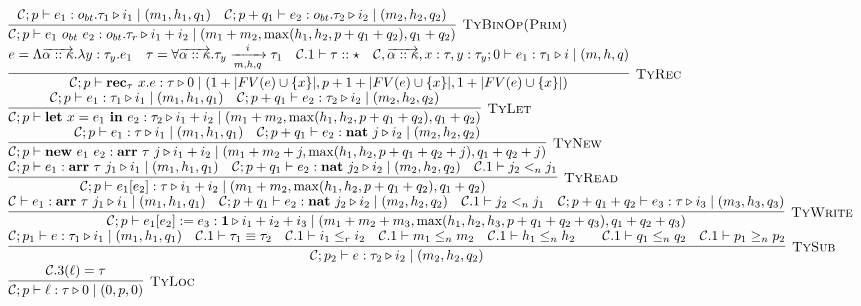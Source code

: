 \documentclass[fleqn]{article}
\begin{document}
\[\begin{array}{l}
\infer[\textsc{TyBinOp(Prim)}]{\jtygc{\mathcal{C};p }{ e_1~o_{bt}~e_2 }{o_{bt}.\tau_r }{ i_1 + i_2 }{ m_1 + m_2}{\max(h_1,h_2,p+q_1+q_2)}{q_1+q_2} }{\jtygc{\mathcal{C};p }{ e_1 }{ o_{bt}.\tau_1 }{ i_1 }{ m_1}{h_1}{q_1} & \jtygc{\mathcal{C};p+q_1 }{ e_2 }{ o_{bt}.\tau_2 }{ i_2 }{ m_2}{h_2}{q_2} } \\

\infer[\textsc{TyRec}]{\jtygc{\mathcal{C};p }{ \mathbf{rec}_\tau~x. e }{ \tau }{ 0 }{1 + |FV(e) \cup \{x\}| }{ p+1+|FV(e)\cup\{x\}| }{1+|FV(e)\cup\{x\}|} }{e = \Lambda \overrightarrow{\alpha :: \kappa}. \lambda y : \tau_y. e_1 & \tau = \forall \overrightarrow{\alpha :: \kappa}. \tau_y \xrightarrow[m,h,q]{i} \tau_1 & \mathcal{C}.1 \vdash \tau :: \star & \jtygc{ \mathcal{C},\overrightarrow{\alpha::\kappa},x:\tau,y:\tau_y;0 }{ e_1 }{ \tau_1 }{ i }{ m}{h}{q}  } \\

\infer[\textsc{TyLet}]{\jtygc{\mathcal{C};p }{ \mathbf{let}~x=e_1~\mathbf{in}~e_2 }{ \tau_2 }{ i_1 + i_2 }{ m_1 + m_2}{\max(h_1,h_2,p+q_1+q_2)}{q_1+q_2} }{\jtygc{\mathcal{C};p }{ e_1 }{ \tau_1 }{ i_1 }{ m_1 }{h_1}{q_1} & \jtygc{\mathcal{C};p+q_1 }{ e_2 }{ \tau_2 }{ i_2 }{ m_2}{h_2}{q_2} } \\

\infer[\textsc{TyNew}]{\jtygc{\mathcal{C};p }{ \mathbf{new}~e_1~e_2 }{ \mathbf{arr}~\tau~j }{ i_1 + i_2 }{ m_1 + m_2 + j}{\max(h_1,h_2,p+q_1+q_2+j) }{q_1+q_2+j} }{\jtygc{\mathcal{C};p }{ e_1 }{\tau }{ i_1 }{ m_1}{h_1}{q_1}  & \jtygc{\mathcal{C};p+q_1 }{ e_2 }{ \mathbf{nat}~j }{ i_2 }{ m_2}{h_2}{q_2} } \\

\infer[\textsc{TyRead}]{\jtygc{\mathcal{C};p }{ e_1[e_2] }{ \tau }{ i_1 + i_2 }{ m_1 + m_2}{\max(h_1,h_2,p+q_1+q_2)}{q_1+q_2} }{\jtygc{\mathcal{C};p }{ e_1 }{ \mathbf{arr}~\tau~j_1 }{ i_1 }{ m_1}{h_1}{q_1} & \jtygc{\mathcal{C};p+q_1 }{ e_2 }{ \mathbf{nat}~j_2 }{ i_2 }{ m_2}{h_2}{q_2} & \mathcal{C}.1 \vdash j_2 <_n j_1 } \\

\infer[\textsc{TyWrite}]{\jtygc{\mathcal{C};p }{ e_1[e_2] := e_3 }{ \mathbf{1} }{ i_1 + i_2 + i_3 }{ m_1 + m_2 + m_3}{\max(h_1,h_2,h_3,p+q_1+q_2+q_3)}{q_1+q_2+q_3} }{\jtygc{\mathcal{C} }{ e_1 }{ \mathbf{arr}~\tau~j_1 }{ i_1 }{ m_1}{h_1}{q_1} & \jtygc{\mathcal{C};p+q_1 }{ e_2 }{\mathbf{nat}~j_2 }{ i_2 }{ m_2}{h_2}{q_2} & \mathcal{C}.1 \vdash j_2 <_n j_1 & \jtygc{\mathcal{C};p+q_1+q_2 }{ e_3 }{ \tau }{ i_3 }{ m_3}{h_3}{q_3} } \\

\infer[\textsc{TySub}]{\jtygc{\mathcal{C};p_2 }{ e }{\tau_2 }{ i_2 }{ m_2}{h_2}{q_2} }{\jtygc{\mathcal{C};p_1 }{ e }{ \tau_1 }{ i_1 }{ m_1 }{h_1}{q_1} & \mathcal{C}.1 \vdash \tau_1 \equiv \tau_2 & \mathcal{C}.1 \vdash i_1 \le_r i_2 & \mathcal{C}.1 \vdash m_1 \le_n m_2 & \mathcal{C}.1 \vdash h_1 \le_n h_2 && \mathcal{C}.1 \vdash q_1 \le_n q_2 & \mathcal{C}.1 \vdash p_1 \ge_n p_2} \\

\infer[\textsc{TyLoc}]{\jtygc{\mathcal{C};p}{\ell}{\tau}{0}{0}{p}{0} }{ \mathcal{C}.3(\ell) = \tau  }

\end{array}
\]
\end{document}
